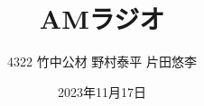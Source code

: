\documentclass[11pt,dvipdfmx]{jarticle}
\begin{document}
\title{AMラジオ}
\author{4322 竹中公材  野村泰平  片田悠李}
\date{2023年11月17日}
\maketitle













\renewcommand{\refname}{参考文献}


\end{document}
